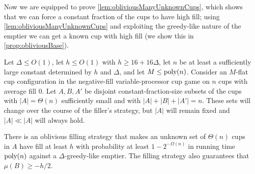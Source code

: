 Now we are equipped to prove \cref{lem:obliviousManyUnknownCups},
which shows that we can force a constant fraction of the cups to
have high fill; using \cref{lem:obliviousManyUnknownCups} and
exploiting the greedy-like nature of the emptier we can get a
known cup with high fill (we show this in
\cref{prop:obliviousBase}).
\begin{lemma}
  \label{lem:obliviousManyUnknownCups}
  Let $\Delta \le O(1)$, let $h \le O(1)$ with $h \ge
  16+16\Delta$, let $n$ be at least a sufficiently large constant
  determined by $h$ and $\Delta$, and let $M \le \operatorname{\text{poly}}(n)$.
  Consider an $M$-flat cup configuration in the negative-fill
  variable-processor cup game on $n$ cups with average fill $0$.
  Let $A, B, A'$ be disjoint constant-fraction-size subsets of
  the cups with $|A| = \Theta(n)$ sufficiently small and with
  $|A| + |B| + |A'| = n$. These sets will change over the course
  of the filler's strategy, but $|A|$ will remain fixed and $|A|
  \ll |A|$ will always hold.

  There is an oblivious filling strategy that makes an unknown
  set of $\Theta(n)$ cups in $A$ have fill at least $h$ with
  probability at least $1-2^{-\Omega(n)}$ in running time
  $\operatorname{\text{poly}}(n)$ against a $\Delta$-greedy-like emptier.
  The filling strategy also guarantees that $\mu(B) \ge -h/2$.
\end{lemma}
